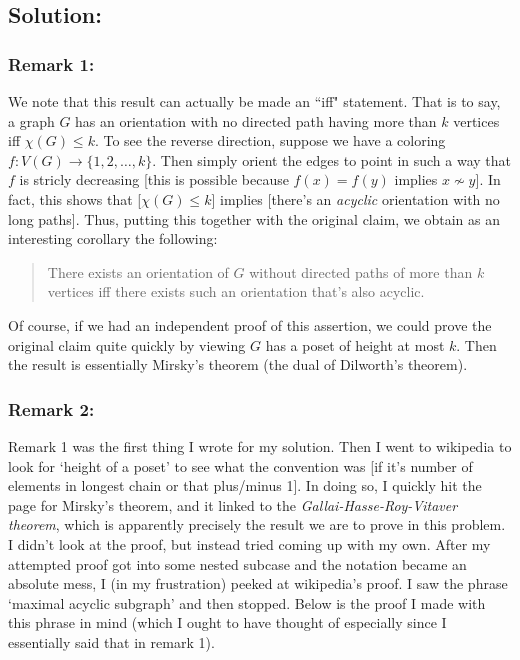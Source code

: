 \documentclass[10pt,a4paper]{article}
\newcommand{\1}{\mathbf{1}}
\begin{document}
\subsection*{Solution:}
\subsubsection*{Remark 1:}
We note that this result can actually be made an ``iff" statement.  That is to say, a graph $G$ has an orientation with no directed path having more than $k$ vertices iff $\chi(G) \leq k$.  To see the reverse direction, suppose we have a coloring $f : V(G) \to \{1, 2, \ldots, k\}$.  Then simply orient the edges to point in such a way that $f$ is stricly decreasing [this is possible because $f(x) = f(y)$ implies $x \not \sim y$].  In fact, this shows that [$\chi(G) \leq k$] implies [there's an \textit{acyclic} orientation with no long paths].  Thus, putting this together with the original claim, we obtain as an interesting corollary the following:
\begin{quotation}
There exists an orientation of $G$ without directed paths of more than $k$ vertices iff there exists such an orientation that's also acyclic.
\end{quotation}
Of course, if we had an independent proof of this assertion, we could prove the original claim quite quickly by viewing $G$ has a poset of height at most $k$.  Then the result is essentially Mirsky's theorem (the dual of Dilworth's theorem).

\subsubsection*{Remark 2:}
Remark 1 was the first thing I wrote for my solution.  Then I went to wikipedia to look for `height of a poset' to see what the convention was [if it's number of elements in longest chain or that plus/minus 1].  In doing so, I quickly hit the page for Mirsky's theorem, and it linked to the \textit{Gallai-Hasse-Roy-Vitaver theorem}, which is apparently precisely the result we are to prove in this problem.  I didn't look at the proof, but instead tried coming up with my own.  After my attempted proof got into some nested subcase and the notation became an absolute mess, I (in my frustration) peeked at wikipedia's proof.  I saw the phrase `maximal acyclic subgraph' and then stopped.  Below is the proof I made with this phrase in mind (which I ought to have thought of especially since I essentially said that in remark 1).
\end{document}
